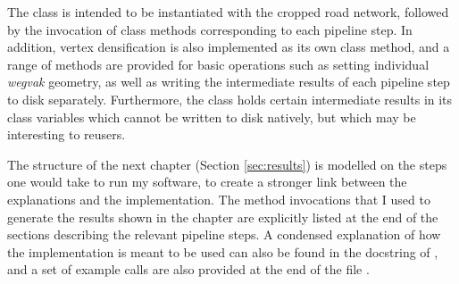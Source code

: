 The class  is intended to be instantiated with the cropped road network, followed by the invocation of class methods corresponding to each pipeline step. In addition, vertex densification is also implemented as its own class method, and a range of methods are provided for basic operations such as setting individual \textit{wegvak} geometry, as well as writing the intermediate results of each pipeline step to disk separately. Furthermore, the class holds certain intermediate results in its class variables which cannot be written to disk natively, but which may be interesting to reusers.

The structure of the next chapter (Section \ref{sec:results}) is modelled on the steps one would take to run my software, to create a stronger link between the explanations and the implementation. The method invocations that I used to generate the results shown in the chapter are explicitly listed at the end of the sections describing the relevant pipeline steps. A condensed explanation of how the implementation is meant to be used can also be found in the docstring of , and a set of example calls are also provided at the end of the file .